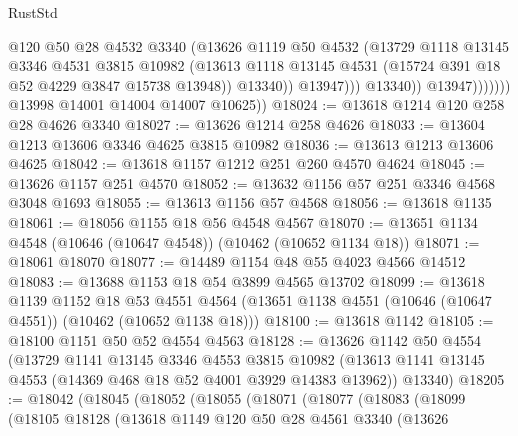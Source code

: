\begin{lexlean}{RustStd}
\begin{coremodule}
                                @120
                                @50
                                @28
                                @4532
                                @3340
                                (@13626
                                  @1119
                                  @50
                                  @4532
                                  (@13729
                                    @1118
                                    @13145
                                    @3346
                                    @4531
                                    @3815
                                    @10982
                                    (@13613
                                      @1118
                                      @13145
                                      @4531
                                      (@15724 @391 @18 @52 @4229 @3847 @15738 @13948))
                                    @13340))
                                @13947)))
                          @13340))
                      @13947)))))))
        @13998
        @14001
        @14004
        @14007
        @10625))
@18024 := @13618 @1214 @120 @258 @28 @4626 @3340
@18027 := @13626 @1214 @258 @4626
@18033 := @13604 @1213 @13606 @3346 @4625 @3815 @10982
@18036 := @13613 @1213 @13606 @4625
@18042 := @13618 @1157 @1212 @251 @260 @4570 @4624
@18045 := @13626 @1157 @251 @4570
@18052 := @13632 @1156 @57 @251 @3346 @4568 @3048 @1693
@18055 := @13613 @1156 @57 @4568
@18056 := @13618 @1135
@18061 := @18056 @1155 @18 @56 @4548 @4567
@18070 := @13651 @1134 @4548 (@10646 (@10647 @4548)) (@10462 (@10652 @1134 @18))
@18071 := @18061 @18070
@18077 := @14489 @1154 @48 @55 @4023 @4566 @14512
@18083 := @13688 @1153 @18 @54 @3899 @4565 @13702
@18099 := @13618
    @1139
    @1152
    @18
    @53
    @4551
    @4564
    (@13651 @1138 @4551 (@10646 (@10647 @4551)) (@10462 (@10652 @1138 @18)))
@18100 := @13618 @1142
@18105 := @18100 @1151 @50 @52 @4554 @4563
@18128 := @13626
    @1142
    @50
    @4554
    (@13729
      @1141
      @13145
      @3346
      @4553
      @3815
      @10982
      (@13613 @1141 @13145 @4553 (@14369 @468 @18 @52 @4001 @3929 @14383 @13962))
      @13340)
@18205 := @18042
    (@18045
      (@18052
        (@18055
          (@18071
            (@18077
              (@18083
                (@18099
                  (@18105
                    @18128
                    (@13618
                      @1149
                      @120
                      @50
                      @28
                      @4561
                      @3340
                      (@13626

\end{coremodule}
\end{lexlean}
